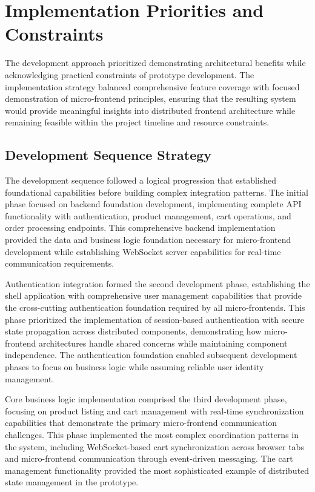 \documentclass[12pt,a4paper]{report}
\begin{document}
\section{Implementation Priorities and Constraints}

The development approach prioritized demonstrating architectural benefits while acknowledging practical constraints of prototype development. The implementation strategy balanced comprehensive feature coverage with focused demonstration of micro-frontend principles, ensuring that the resulting system would provide meaningful insights into distributed frontend architecture while remaining feasible within the project timeline and resource constraints.

\subsection{Development Sequence Strategy}

The development sequence followed a logical progression that established foundational capabilities before building complex integration patterns. The initial phase focused on backend foundation development, implementing complete API functionality with authentication, product management, cart operations, and order processing endpoints. This comprehensive backend implementation provided the data and business logic foundation necessary for micro-frontend development while establishing WebSocket server capabilities for real-time communication requirements.

Authentication integration formed the second development phase, establishing the shell application with comprehensive user management capabilities that provide the cross-cutting authentication foundation required by all micro-frontends. This phase prioritized the implementation of session-based authentication with secure state propagation across distributed components, demonstrating how micro-frontend architectures handle shared concerns while maintaining component independence. The authentication foundation enabled subsequent development phases to focus on business logic while assuming reliable user identity management.

Core business logic implementation comprised the third development phase, focusing on product listing and cart management with real-time synchronization capabilities that demonstrate the primary micro-frontend communication challenges. This phase implemented the most complex coordination patterns in the system, including WebSocket-based cart synchronization across browser tabs and micro-frontend communication through event-driven messaging. The cart management functionality provided the most sophisticated example of distributed state management in the prototype.
\end{document}
